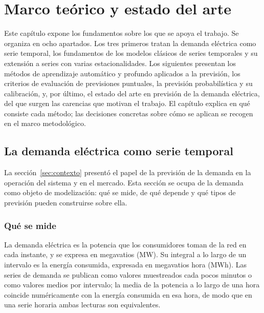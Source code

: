 
\chapter{Marco teórico y estado del arte}\label{cap:marco-teorico}

Este capítulo expone los fundamentos sobre los que se apoya el trabajo. Se
organiza en ocho apartados. Los tres primeros tratan la demanda eléctrica
como serie temporal, los fundamentos de los modelos clásicos de series
temporales y su extensión a series con varias estacionalidades. Los
siguientes presentan los métodos de aprendizaje automático y profundo
aplicados a la previsión, los criterios de evaluación de previsiones
puntuales, la previsión probabilística y su calibración, y, por último, el
estado del arte en previsión de la demanda eléctrica, del que surgen las
carencias que motivan el trabajo. El capítulo explica en qué consiste cada
método; las decisiones concretas sobre cómo se aplican se recogen en el
marco metodológico.

\section{La demanda eléctrica como serie temporal}\label{sec:demanda-serie}

La sección~\ref{sec:contexto} presentó el papel de la previsión de la demanda
en la operación del sistema y en el mercado. Esta sección se ocupa de la
demanda como objeto de modelización: qué se mide, de qué depende y qué tipos
de previsión pueden construirse sobre ella.

\subsection{Qué se mide}\label{sec:que-se-mide}

La demanda eléctrica es la potencia que los consumidores toman de la red en
cada instante, y se expresa en megavatios (MW). Su integral a lo largo de un
intervalo es la energía consumida, expresada en megavatios hora (MWh). Las
series de demanda se publican como valores muestreados cada pocos minutos o
como valores medios por intervalo; la media de la potencia a lo largo de una
hora coincide numéricamente con la energía consumida en esa hora, de modo
que en una serie horaria ambas lecturas son equivalentes.

